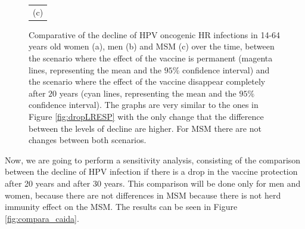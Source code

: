 \begin{figure}[!]
\begin{tabular}{cc}
		\multicolumn{2}{c}{(c)} \\ 
	\end{tabular} 
	\caption{Comparative of the decline of  HPV oncogenic HR infections in 14-64 years old women (a), men (b) and MSM (c) over the time, between the scenario where the effect of the vaccine is permanent (magenta lines, representing  the mean and the $95\%$ confidence interval) and the scenario where the effect of the vaccine disappear completely after $20$ years (cyan lines, representing  the mean and the $95\%$ confidence interval). The graphs are very similar to the ones in Figure \ref{fig:dropLRESP} with the only change that the difference between the levels of decline are higher. For MSM there are not changes between both scenarios.}
	\label{fig:dropHRESP}
\end{figure}

Now, we are going to perform a sensitivity analysis, consisting of the comparison between the decline of HPV infection if there is a drop in the vaccine protection after 20 years and after 30 years. This comparison will be done only for men and women, because there are not differences in MSM because there is not herd immunity effect on the MSM. The results can be seen in Figure \ref{fig:compara_caida}.

